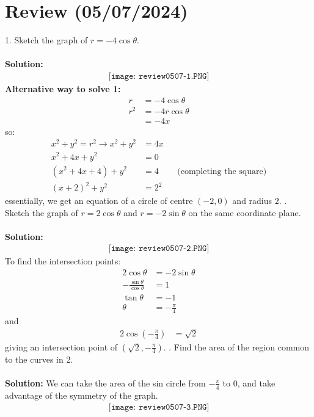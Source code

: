 \documentclass{article}
\begin{document}
\section*{Review (05/07/2024)}

1. Sketch the graph of $r = -4\cos\theta$.
\\\\
\textbf{Solution:}
\begin{align*}\texttt{[image: review0507-1.PNG]}\end{align*}
\textbf{Alternative way to solve 1:}
\begin{align*}
    r &= -4 \cos \theta \\
    r^2 &= -4 r \cos \theta \\
    &= -4x
\end{align*}
so:
\begin{align*}
    x^2+y^2 = r^2 \rightarrow x^2 + y^2 &= 4x \\
    x^2+4x+y^2 &= 0 \\
    (x^2+4x+4)+y^2 &= 4 && \text{(completing the square)} \\
    (x+2)^2 + y^2 &= 2^2
\end{align*}
essentially, we get an equation of a circle of centre $(-2,0)$ and radius $2$.
. Sketch the graph of $r = 2\cos\theta$ and $r = -2\sin\theta$ on the same coordinate plane.
\\\\
\textbf{Solution:}
\begin{align*}\texttt{[image: review0507-2.PNG]}\end{align*}
To find the intersection points:
\begin{align*}
    2\cos\theta &= -2\sin\theta \\
    -\frac{\sin\theta}{\cos\theta} &= 1 \\
    \tan\theta &= -1 \\
    \theta &= -\frac{\pi}{4}
\end{align*}
and
\begin{align*}
    2\cos(-\frac{\pi}{4}) &= \sqrt{2}
\end{align*}
giving an intersection point of $(\sqrt{2}, -\frac{\pi}{4})$.
. Find the area of the region common to the curves in 2.
\\\\
\textbf{Solution:}
We can take the area of the sin circle from $-\frac{\pi}{4}$ to $0$, and take advantage of the symmetry of the graph.
\begin{align*}\texttt{[image: review0507-3.PNG]}\end{align*}
\end{document}
